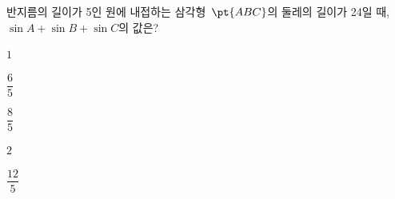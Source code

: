 반지름의 길이가 5인 원에 내접하는 삼각형~$\pt{ABC}$의 둘레의 길이가 24일 때, $\sin A+\sin B+\sin C$의 값은?
\begin{choicesii}{\rule[-3ex]{0pt}{8ex}$1$}{\rule[-3ex]{0pt}{8ex}$\dfrac{6}{5}$}{\rule[-3ex]{0pt}{8ex}$\dfrac{8}{5}$}{\rule[-3ex]{0pt}{8ex}$2$}{\rule[-3ex]{0pt}{8ex}$\dfrac{12}{5}$}\end{choicesii}

